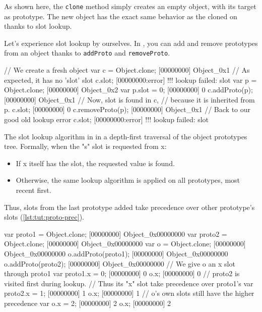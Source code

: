 As shown here, the \lstinline{clone} method simply creates an empty
object, with its target as prototype. The new object has the exact
same behavior as the cloned on thanks to slot lookup.

Let's experience slot lookup by ourselves. In \us, you can add and
remove prototypes from an object thanks to \lstinline{addProto} and
\lstinline{removeProto}.

\begin{urbiscript}[caption=Manipulating prototypes, label=lst:tut:proto-change]
// We create a fresh object
var c = Object.clone;
[00000000] Object_0x1
// As expected, it has no 'slot' slot
c.slot;
[00000000:error] !!! lookup failed: slot
var p = Object.clone;
[00000000] Object_0x2
var p.slot = 0;
[00000000] 0
c.addProto(p);
[00000000] Object_0x1
// Now, slot is found in c,
// because it is inherited from p.
c.slot;
[00000000] 0
c.removeProto(p);
[00000000] Object_0x1
// Back to our good old lookup error
c.slot;
[00000000:error] !!! lookup failed: slot
\end{urbiscript}

The slot lookup algorithm in \us in a depth-first traversal of the
object prototypes tree. Formally, when the "s" slot is requested from
x:

\begin{itemize}
\item If x itself has the slot, the requested value is found.
\item Otherwise, the same lookup algorithm is applied on all
  prototypes, most recent first.
\end{itemize}

Thus, slots from the last prototype added take precedence over other
prototype's slots (\autoref{lst:tut:proto-prec}).

\begin{urbiscript}[caption=Prototype precedence, label=lst:tut:proto-prec]
var proto1 = Object.clone;
[00000000] Object_0x00000000
var proto2 = Object.clone;
[00000000] Object_0x00000000
var o = Object.clone;
[00000000] Object_0x00000000
o.addProto(proto1);
[00000000] Object_0x00000000
o.addProto(proto2);
[00000000] Object_0x00000000
// We give o an x slot through proto1
var proto1.x = 0;
[00000000] 0
o.x;
[00000000] 0
// proto2 is visited first during lookup.
// Thus its "x" slot take precedence over proto1's
var proto2.x = 1;
[00000000] 1
o.x;
[00000000] 1
// o's own slots still have the higher precedence
var o.x = 2;
[00000000] 2
o.x;
[00000000] 2
\end{urbiscript}

